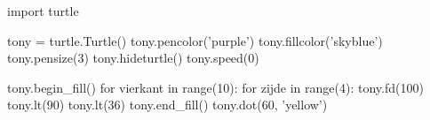 \documentclass[../main]{subfiles}
\begin{document}
\begin{antwoord}
\begin{python-breakable}[style=mu-noframe, numbers=none]
import turtle

tony = turtle.Turtle()
tony.pencolor('purple')
tony.fillcolor('skyblue')
tony.pensize(3)
tony.hideturtle()
tony.speed(0)

tony.begin_fill()
for vierkant in range(10):
    for zijde in range(4):
        tony.fd(100)
        tony.lt(90)
    tony.lt(36)
tony.end_fill()
tony.dot(60, 'yellow')
\end{python-breakable}
\end{antwoord}

\end{document}
